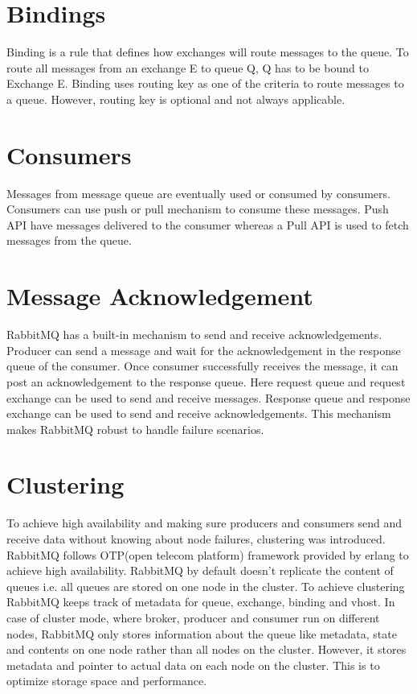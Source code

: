 \documentclass[9pt,twocolumn,twoside]{../../styles/osajnl}
\begin{document}
\section{Bindings}
Binding is a rule that defines how exchanges will route messages to the queue.
To route all messages from an exchange E to queue Q, Q has to be bound to
Exchange E. Binding uses routing key as one of the criteria to route messages to
a queue. However, routing key is optional and not always applicable.

\section{Consumers}
Messages from message queue are eventually used or consumed by consumers.
Consumers can use push or pull mechanism to consume these messages. Push API
have messages delivered to the consumer whereas a Pull API is used to fetch
messages from the queue. 

\section{Message Acknowledgement}
RabbitMQ has a built-in mechanism to send and receive acknowledgements. Producer
can send a message and wait for the acknowledgement in the response queue of the
consumer.  Once consumer successfully receives the message, it can post an
acknowledgement to the response queue. Here request queue and request exchange
can be used to send and receive messages. Response queue and response
exchange can be used to send and receive acknowledgements. This mechanism makes
RabbitMQ robust to handle failure scenarios.

\section{Clustering}
To achieve high availability \cite{videla2012rabbitmq} and making sure producers
and consumers send and receive data without knowing about node failures,
clustering was introduced. RabbitMQ follows OTP(open telecom platform) framework
provided by erlang to achieve high availability. RabbitMQ by default doesn't
replicate the content of queues i.e. all queues are stored on one node in the
cluster. To achieve clustering RabbitMQ keeps track of metadata for queue,
exchange, binding and vhost. In case of cluster mode, where broker, producer and
consumer run on different nodes, RabbitMQ only stores information about the
queue like metadata, state and contents on one node rather than all nodes on the
cluster. However, it stores metadata and pointer to actual data on each node on
the cluster. This is to optimize storage space and performance. 
\end{document}
